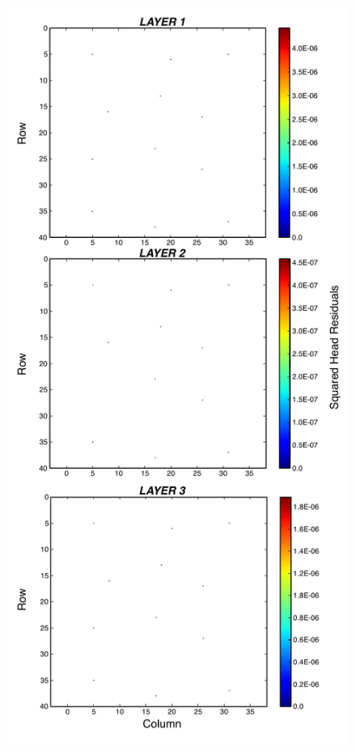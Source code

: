 \documentclass[11pt,oneside,onecolumn]{usgsreport}
\begin{document}
\begin{appendix}
\begin{figure}[!t]
\begin{center}\includegraphics[scale=0.5]{figures/3L_resid_case5}\end{center}


\end{figure}
\end{appendix}
\end{document}
